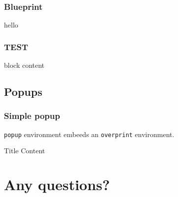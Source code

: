 \documentclass[aspectratio=169]{beamer}
\begin{document}
\begin{blueprintframe}
  \frametitle{Blueprint}
  hello
\end{blueprintframe}


\begin{frame}[fragile,t]
  \frametitle{TEST}
  \begin{block}{block}
    content
  \end{block}
\end{frame}

\subsection{Popups}
\begin{frame}
  \frametitle{Simple popup}
  \texttt{popup} environment embeeds an \texttt{overprint} environment.
  \begin{popup}{.75}
    \begin{macosbox}{Title}
      Content
    \end{macosbox}
  \end{popup}
\end{frame}

\section{Any questions?}


%   
%   



\end{document}
